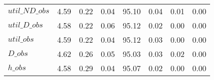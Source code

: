 \begin{center}
\begin{longtable}{lccccccc}
$util\_ND\_obs  $	 & 	         4.59	 & 	         0.22	 & 	         0.04	 & 	        95.10	 & 	         0.04	 & 	         0.01	 & 	         0.00 \\ 
$util\_D\_obs   $	 & 	         4.58	 & 	         0.22	 & 	         0.06	 & 	        95.12	 & 	         0.02	 & 	         0.00	 & 	         0.00 \\ 
$util\_obs      $	 & 	         4.59	 & 	         0.22	 & 	         0.04	 & 	        95.12	 & 	         0.03	 & 	         0.00	 & 	         0.00 \\ 
$D\_obs         $	 & 	         4.62	 & 	         0.26	 & 	         0.05	 & 	        95.03	 & 	         0.03	 & 	         0.02	 & 	         0.00 \\ 
$h\_obs         $	 & 	         4.58	 & 	         0.29	 & 	         0.04	 & 	        95.07	 & 	         0.02	 & 	         0.00	 & 	         0.00 \\ 
\end{longtable}
 \end{center}
